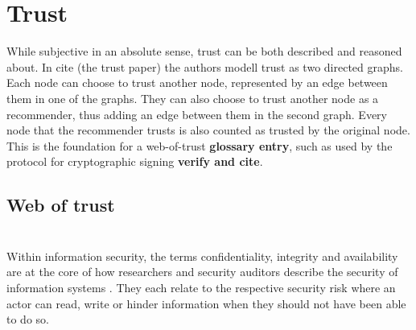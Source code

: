 \documentclass[english, biblatex, digitaloutput]{kththesis}
\begin{document}

\section{Trust}

While subjective in an absolute sense, trust can be both described and reasoned about. In cite (the trust paper) the authors modell trust as two directed graphs. Each node can choose to trust another node, represented by an edge between them in one of the graphs. They can also choose to trust another node as a recommender, thus adding an edge between them in the second graph. Every node that the recommender trusts is also counted as trusted by the original node. This is the foundation for a web-of-trust \textbf{glossary entry}, such as used by the  protocol for cryptographic signing \textbf{verify and cite}.

\subsection{}

\subsection{Web of trust}

\subsection{}

\subsection{}

\section{}

Within information security, the terms confidentiality, integrity and availability are at the core of how researchers and security auditors describe the security of information systems \cite{samonas_cia_nodate}. They each relate to the respective security risk where an actor can read, write or hinder information when they should not have been able to do so.
\end{document}
